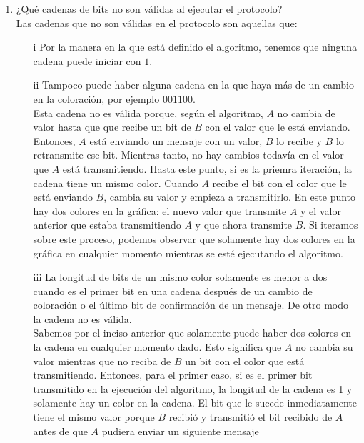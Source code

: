 \documentclass[12pt,a4paper]{report}
\begin{document}
\begin{enumerate}
{		\begin{enumerate} [label = \alph*]
			\item {
				¿Qué cadenas de bits no son válidas al ejecutar el protocolo?\\
				Las cadenas que no son válidas en el protocolo son aquellas que:
				\begin{enumerate}
					\item[i]{
						Por la manera en la que está definido el algoritmo, tenemos que
						ninguna cadena puede iniciar con $1$.
					}
					\item[ii]{
						Tampoco puede haber alguna cadena en la que haya más de un cambio en la
						 coloración, por ejemplo $001100$.\\
						Esta cadena no es válida porque, según el algoritmo, $A$ no cambia de 
						valor hasta que que recibe un bit de $B$ con el valor que le está 
						enviando. Entonces, $A$ está enviando un mensaje con un valor, $B$ lo 
						recibe y $B$ lo retransmite ese bit. Mientras tanto, no hay cambios 
						todavía en el valor que $A$ está transmitiendo. Hasta este punto, si es 
						la priemra iteración, la cadena tiene un mismo color. Cuando $A$ recibe 
						el bit con el color que le está enviando $B$, cambia su valor y empieza a 
						transmitirlo. En este punto hay dos colores en la gráfica: el nuevo valor 
						que transmite $A$ y el valor anterior que estaba transmitiendo $A$ y que 
						ahora transmite $B$. Si iteramos sobre este proceso, podemos observar que 
						solamente hay dos colores en la gráfica en cualquier momento mientras se 
						esté ejecutando el algoritmo.
					}
					\item[iii]{
						La longitud de bits de un mismo color solamente es menor a dos cuando es 
						el primer bit en una cadena después de un cambio de coloración o el 
						último bit de confirmación de un mensaje. De otro modo la cadena no es 
						válida.\\
						Sabemos por el inciso anterior que solamente puede haber dos colores en 
						la cadena en cualquier momento dado. Esto significa que $A$ no cambia su
						valor mientras que no reciba de $B$ un bit con el color que está 
						transmitiendo. Entonces, para el primer caso, si es el primer bit 
						transmitido en la ejecución del algoritmo, la longitud de la cadena es 1 
						y solamente hay un color en la cadena. El bit que le sucede 
						inmediatamente tiene el mismo valor porque $B$ recibió y transmitió el 
						bit recibido de $A$ antes de que $A$ pudiera enviar un siguiente mensaje
}
\end{enumerate}}
\end{enumerate}}
\end{enumerate}
\end{document}

